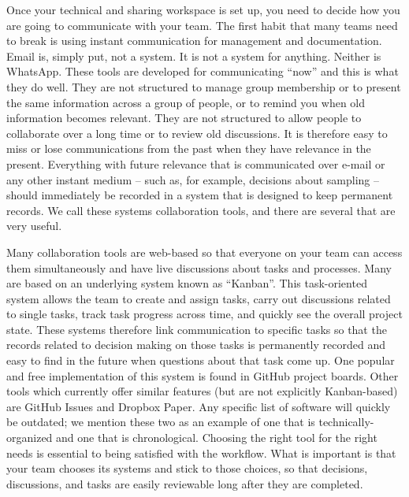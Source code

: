 Once your technical and sharing workspace is set up,
you need to decide how you are going to communicate with your team.
The first habit that many teams need to break
is using instant communication for management and documentation.
Email is, simply put, not a system. It is not a system for anything. Neither is WhatsApp.
These tools are developed for communicating ``now'' and this is what they do well.
They are not structured to manage group membership or to present the same information
across a group of people, or to remind you when old information becomes relevant.
They are not structured to allow people to collaborate over a long time or to review old discussions.
It is therefore easy to miss or lose communications from the past when they have relevance in the present.
Everything with future relevance that is communicated over e-mail or any other instant medium
-- such as, for example, decisions about sampling --
should immediately be recorded in a system that is designed to keep permanent records.
We call these systems collaboration tools, and there are several that are very useful.

Many collaboration tools are web-based
so that everyone on your team can access them simultaneously
and have live discussions about tasks and processes.
Many are based on an underlying system known as ``Kanban''.
This task-oriented system allows the team to create and assign tasks,
carry out discussions related to single tasks,
track task progress across time, and quickly see the overall project state.
These systems therefore link communication to specific tasks so that
the records related to decision making on those tasks is permanently recorded
and easy to find in the future when questions about that task come up.
One popular and free implementation of this system is found in GitHub project boards.
Other tools which currently offer similar features (but are not explicitly Kanban-based)
are GitHub Issues and Dropbox Paper.
Any specific list of software will quickly be outdated;
we mention these two as an example of one that is technically-organized and one that is chronological.
Choosing the right tool for the right needs is essential to being satisfied with the workflow.
What is important is that your team chooses its systems and stick to those choices,
so that decisions, discussions, and tasks are easily reviewable long after they are completed.

